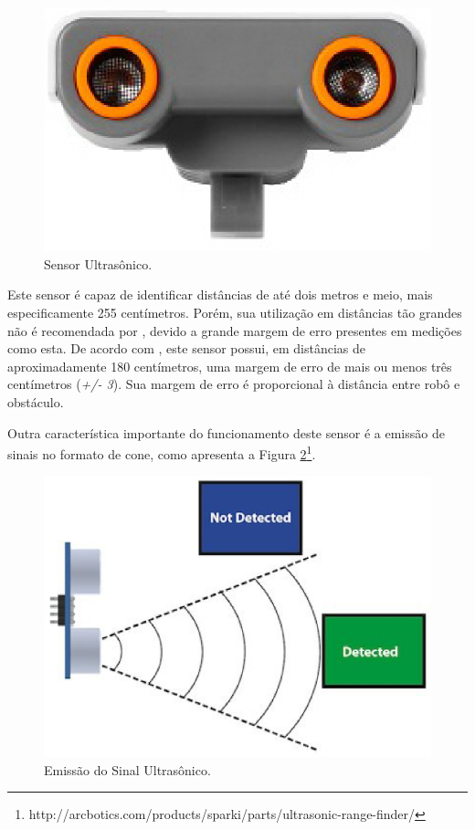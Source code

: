 \begin{itemize}
				\begin{figure}[H]
					\centering
					\includegraphics[scale=0.5]{figuras/ultrasonic.eps}
					\caption{Sensor Ultrasônico.}
					\label{img:ultrasonic}
				\end{figure}

				Este sensor é capaz de identificar distâncias de até dois metros e meio, mais especificamente 255 centímetros. Porém, sua utilização em distâncias tão grandes não é recomendada por \cite{legonxj}, devido a grande margem de erro presentes em medições como esta. De acordo com \cite{legonxj}, este sensor possui, em distâncias de aproximadamente 180 centímetros, uma margem de erro de mais ou menos três centímetros (\textit{+/- 3}). Sua margem de erro é proporcional à distância entre robô e obstáculo.

				Outra característica importante do funcionamento deste sensor é a emissão de sinais no formato de cone, como apresenta a Figura \ref{img:cone2}\footnote{http://arcbotics.com/products/sparki/parts/ultrasonic-range-finder/}.


				\begin{figure}[H]
					\centering
					\includegraphics[scale=0.7]{figuras/cone2.eps}
					\caption{Emissão do Sinal Ultrasônico.}
					\label{img:cone2}
				\end{figure}


\end{itemize}
